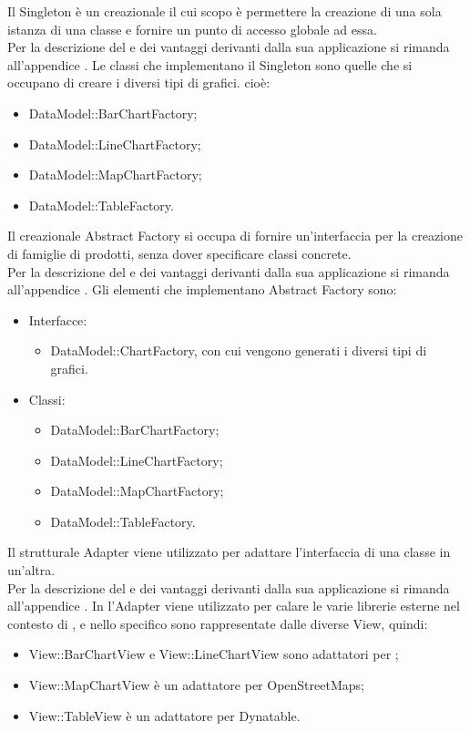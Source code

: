 			Il Singleton è un  creazionale il cui scopo è permettere la creazione di una sola istanza di una classe e fornire un punto di accesso globale ad essa.\\
			Per la descrizione del  e dei vantaggi derivanti dalla sua applicazione si rimanda all'appendice .
				Le classi che implementano il Singleton sono quelle che si occupano di creare i diversi tipi di grafici. cioè:
				\begin{itemize}
					\item DataModel::BarChartFactory;
					\item DataModel::LineChartFactory;
					\item DataModel::MapChartFactory;
					\item DataModel::TableFactory.
			\end{itemize}
			Il  creazionale Abstract Factory si occupa di fornire un'interfaccia per la creazione di famiglie di prodotti, senza dover specificare classi concrete. \\
			Per la descrizione del  e dei vantaggi derivanti dalla sua applicazione si rimanda all'appendice .
				Gli elementi che implementano Abstract Factory sono:
				\begin{itemize}
				\item Interfacce:
					\begin{itemize}
						\item DataModel::ChartFactory, con cui vengono generati i diversi tipi di grafici.
					\end{itemize}
				\item Classi:
					\begin{itemize}
						\item DataModel::BarChartFactory;
						\item DataModel::LineChartFactory;
						\item DataModel::MapChartFactory;
						\item DataModel::TableFactory.
					\end{itemize}
				\end{itemize}
			Il  strutturale Adapter viene utilizzato per adattare l'interfaccia di una classe in un'altra.\\
			Per la descrizione del  e dei vantaggi derivanti dalla sua applicazione si rimanda all'appendice .
				In  l'Adapter viene utilizzato per calare le varie librerie esterne nel contesto di \projectname{}, e nello specifico sono rappresentate dalle diverse View, quindi:
				\begin{itemize}
					\item View::BarChartView e View::LineChartView sono adattatori per ;
					\item View::MapChartView è un adattatore per OpenStreetMaps;
					\item View::TableView è un adattatore per Dynatable.
				\end{itemize}
